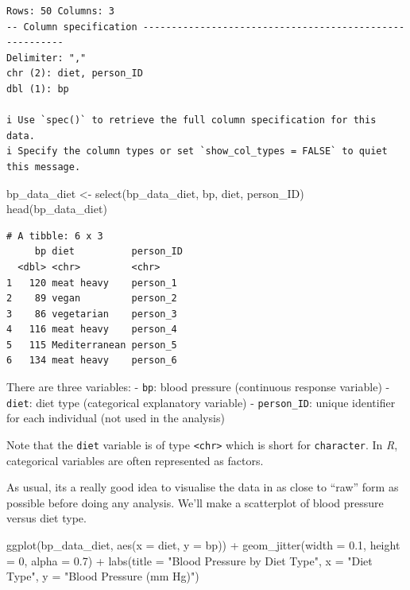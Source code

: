 \documentclass[
  letterpaper,
  8pt,
  a4paper]{book}
\newenvironment{Shaded}{\begin{snugshade}}{\end{snugshade}}
\newcommand{\AttributeTok}[1]{\textcolor[rgb]{0.40,0.45,0.13}{#1}}
\newcommand{\DecValTok}[1]{\textcolor[rgb]{0.68,0.00,0.00}{#1}}
\newcommand{\FloatTok}[1]{\textcolor[rgb]{0.68,0.00,0.00}{#1}}
\newcommand{\FunctionTok}[1]{\textcolor[rgb]{0.28,0.35,0.67}{#1}}
\newcommand{\NormalTok}[1]{\textcolor[rgb]{0.00,0.23,0.31}{#1}}
\newcommand{\OtherTok}[1]{\textcolor[rgb]{0.00,0.23,0.31}{#1}}
\newcommand{\SpecialCharTok}[1]{\textcolor[rgb]{0.37,0.37,0.37}{#1}}
\newcommand{\StringTok}[1]{\textcolor[rgb]{0.13,0.47,0.30}{#1}}
\begin{document}
\begin{verbatim}
Rows: 50 Columns: 3
-- Column specification --------------------------------------------------------
Delimiter: ","
chr (2): diet, person_ID
dbl (1): bp

i Use `spec()` to retrieve the full column specification for this data.
i Specify the column types or set `show_col_types = FALSE` to quiet this message.
\end{verbatim}

\begin{Shaded}
\begin{Highlighting}[]
\NormalTok{bp\_data\_diet }\OtherTok{\textless{}{-}} \FunctionTok{select}\NormalTok{(bp\_data\_diet, bp, diet, person\_ID)}
\FunctionTok{head}\NormalTok{(bp\_data\_diet)}
\end{Highlighting}
\end{Shaded}

\begin{verbatim}
# A tibble: 6 x 3
     bp diet          person_ID
  <dbl> <chr>         <chr>    
1   120 meat heavy    person_1 
2    89 vegan         person_2 
3    86 vegetarian    person_3 
4   116 meat heavy    person_4 
5   115 Mediterranean person_5 
6   134 meat heavy    person_6 
\end{verbatim}

There are three variables: - \texttt{bp}: blood pressure (continuous
response variable) - \texttt{diet}: diet type (categorical explanatory
variable) - \texttt{person\_ID}: unique identifier for each individual
(not used in the analysis)

Note that the \texttt{diet} variable is of type
\texttt{\textless{}chr\textgreater{}} which is short for
\texttt{character}. In \emph{R}, categorical variables are often
represented as factors.

As usual, its a really good idea to visualise the data in as close to
``raw'' form as possible before doing any analysis. We'll make a
scatterplot of blood pressure versus diet type.

\begin{Shaded}
\begin{Highlighting}[]
\FunctionTok{ggplot}\NormalTok{(bp\_data\_diet, }\FunctionTok{aes}\NormalTok{(}\AttributeTok{x =}\NormalTok{ diet, }\AttributeTok{y =}\NormalTok{ bp)) }\SpecialCharTok{+}
  \FunctionTok{geom\_jitter}\NormalTok{(}\AttributeTok{width =} \FloatTok{0.1}\NormalTok{, }\AttributeTok{height =} \DecValTok{0}\NormalTok{, }\AttributeTok{alpha =} \FloatTok{0.7}\NormalTok{) }\SpecialCharTok{+}
  \FunctionTok{labs}\NormalTok{(}\AttributeTok{title =} \StringTok{"Blood Pressure by Diet Type"}\NormalTok{,}
       \AttributeTok{x =} \StringTok{"Diet Type"}\NormalTok{,}
       \AttributeTok{y =} \StringTok{"Blood Pressure (mm Hg)"}\NormalTok{) }
\end{Highlighting}
\end{Shaded}
\end{document}
